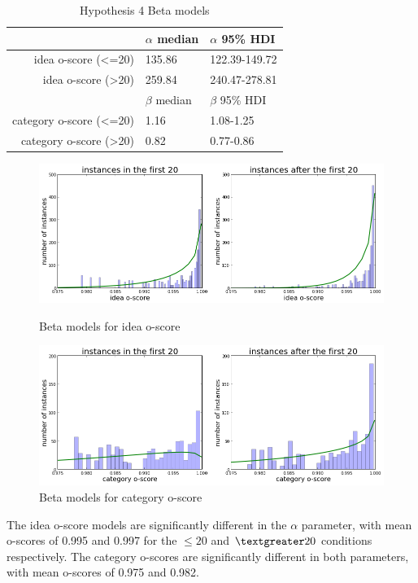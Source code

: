 \begin{table}
	\begin{tabular}[h!]{r | l l }
	    & $\alpha$ median & $\alpha$ 95\% HDI \\ \hline \hline
        idea o-score (\textless=20) & 135.86 & 122.39-149.72 \\
        idea o-score (\textgreater20) & 259.84 & 240.47-278.81 \\ \hline \hline
	    & $\beta$ median & $\beta$ 95\% HDI \\ \hline \hline
        category o-score (\textless=20) & 1.16 & 1.08-1.25 \\
        category o-score (\textgreater20) & 0.82 & 0.77-0.86 \\
	\end{tabular}
    \caption{Hypothesis 4 Beta models}
    \label{tab:hyp4}
\end{table}

\begin{figure}[h]
    \centering
    \includegraphics[width=0.9\columnwidth]{hyp4_ideas}
    \caption{Beta models for idea o-score}
    \label{fig:idea_oscore_hyp4}
    \includegraphics[width=0.9\columnwidth]{hyp4_cats}
    \caption{Beta models for category o-score}
    \label{fig:cat_oscore_hyp4}
\end{figure}

The idea o-score models are significantly different in the $\alpha$ parameter, with mean o-scores of 0.995 and 0.997 for the $\leq20$ and $\textgreater20$ conditions respectively. The category o-scores are significantly different in both parameters, with mean o-scores of 0.975 and 0.982.

